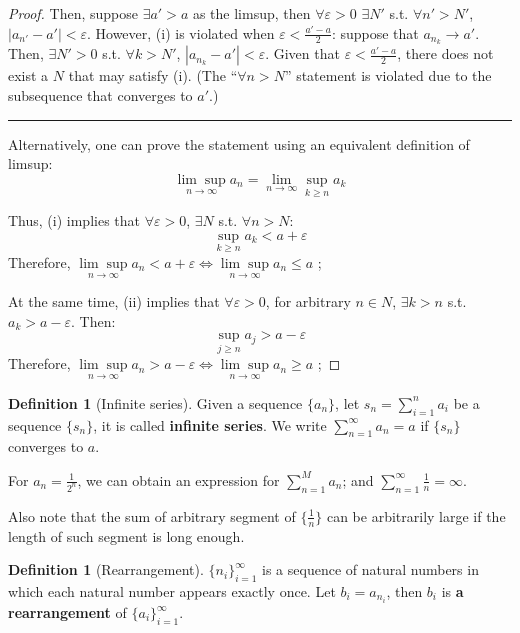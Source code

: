 \documentclass[12pt]{article}
\theoremstyle{definition}
\newtheorem{definition}[theorem]{Definition}
\theoremstyle{plain}
\begin{document}
\begin{proof}
    Then, suppose $\exists a' > a$ as the limsup, then $\forall \varepsilon > 0$ 
    $\exists N' $ s.t. $\forall n' > N'$, $|a_{n'} - a'| < \varepsilon$. 
    However, (i) is violated when $\varepsilon < \frac{a' - a}{2}$: suppose that 
    $a_{n_k} \to a'$. Then, $\exists N' > 0$ s.t. $\forall k > N'$, $|a_{n_k} - a'| < 
    \varepsilon$. Given that $\varepsilon < \frac{a'-a}{2}$, there does not 
    exist a $N$ that may satisfy (i). (The ``$\forall n > N$'' statement is 
    violated due to the subsequence that converges to $a'$.)
    \noindent\rule{\textwidth}{1pt} %

    Alternatively, one can prove the statement using an equivalent definition of 
    limsup: 
    \[
        \underset{n \to \infty} {\lim\sup} a_n = \lim_{n\to\infty} \sup_{k \ge 
        n} a_k
    \]

    Thus, (i) implies that $\forall \varepsilon > 0$, $\exists N$ s.t. $\forall 
    n > N$:
    \[
        \sup_{k\ge n} a_k < a + \varepsilon
    \]
    Therefore, $\underset{n \to \infty} {\lim\sup} a_n < a + \varepsilon \iff 
    \underset{n \to \infty} {\lim\sup} a_n \le a$ ;

    At the same time, (ii) implies that $\forall \varepsilon > 0$, for arbitrary 
    $n \in N$, $\exists k > n$ s.t. $a_k > a - \varepsilon$. Then:
    \[
        \sup_{j\ge n} a_j > a - \varepsilon
    \]
    Therefore, $\underset{n \to \infty} {\lim\sup} a_n > a - \varepsilon \iff 
    \underset{n \to \infty} {\lim\sup} a_n \ge a$ ;
\end{proof}

\begin{definition}
    [Infinite series]
    Given a sequence $\{a_n\}$, let $s_n = \sum_{i=1}^n a_i$ be a sequence 
    $\{s_n\}$, it is called \textbf{infinite series}. 
    We write $\sum_{n=1}^\infty a_n = a$ if $\{s_n\}$ converges to $a$.
    \begin{example}
        For $a_n = \frac{1}{2^n}$, we can obtain an expression for $\sum_{n=1}^M 
        a_n$; 
        and $\sum_{n=1}^\infty \frac{1}{n} = \infty$.

        Also note that the sum of arbitrary segment of $\{\frac{1}{n}\}$ can be 
        arbitrarily large if the length of such segment is long enough.
    \end{example}
\end{definition}

\begin{definition}
    [Rearrangement]
    $\{n_i\}_{i=1}^\infty$ is a sequence of natural numbers in which each 
    natural number appears exactly once. Let $b_i = a_{n_i}$, then $b_i$ is 
    \textbf{a rearrangement } of $\{a_i\}_{i=1}^\infty$.
\end{definition}
\end{document}
